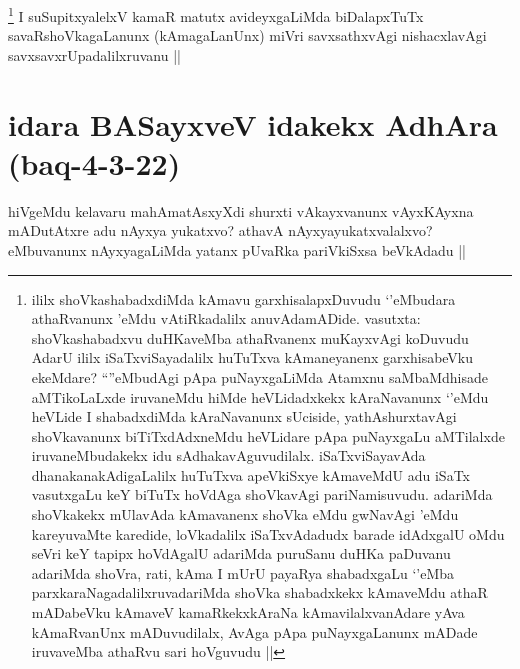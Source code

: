 
\begin{artha}
\footnote{ililx shoVkashabadxdiMda kAmavu garxhisalapxDuvudu `\stext'eMbudara athaRvanunx \stext'eMdu vAtiRkadalilx anuvAdamADide. vasutxta: shoVkashabadxvu duHKaveMba athaRvanenx muKayxvAgi koDuvudu AdarU ililx iSaTxviSayadalilx huTuTxva kAmaneyanenx garxhisabeVku ekeMdare? ``\stext''eMbudAgi pApa puNayxgaLiMda Atamxnu saMbaMdhisade aMTikoLaLxde iruvaneMdu hiMde heVLidadxkekx kAraNavanunx `\stext'eMdu heVLide I shabadxdiMda kAraNavanunx sUciside, yathAshurxtavAgi shoVkavanunx biTiTxdAdxneMdu heVLidare pApa puNayxgaLu aMTilalxde iruvaneMbudakekx idu sAdhakavAguvudilalx. iSaTxviSayavAda dhanakanakAdigaLalilx huTuTxva apeVkiSxye kAmaveMdU adu iSaTx vasutxgaLu keY biTuTx hoVdAga shoVkavAgi pariNamisuvudu. adariMda shoVkakekx mUlavAda kAmavanenx shoVka eMdu gwNavAgi \stext'eMdu kareyuvaMte karedide, loVkadalilx iSaTxvAdadudx barade idAdxgalU oMdu seVri keY tapipx hoVdAgalU adariMda puruSanu duHKa paDuvanu adariMda shoVra, rati, kAma I mUrU payaRya shabadxgaLu `\stext'eMba parxkaraNagadalilxruvadariMda shoVka shabadxkekx kAmaveMdu athaR mADabeVku kAmaveV kamaRkekxkAraNa kAmavilalxvanAdare yAva kAmaRvanUnx mADuvudilalx, AvAga pApa puNayxgaLanunx mADade iruvaveMba athaRvu sari hoVguvudu ||}
I suSupitxyalelxV kamaR matutx avideyxgaLiMda biDalapxTuTx savaRshoVkagaLanunx (kAmagaLanUnx) miVri savxsathxvAgi nishacxlavAgi savxsavxrUpadalilxruvanu ||
\end{artha}

\section*{idara BASayxveV idakekx AdhAra (baq-4-3-22)}


\begin{artha}
hiVgeMdu kelavaru mahAmatAsxyXdi shurxti vAkayxvanunx vAyxKAyxna mADutAtxre adu nAyxya yukatxvo? athavA nAyxyayukatxvalalxvo? eMbuvanunx nAyxyagaLiMda yatanx pUvaRka pariVkiSxsa beVkAdadu ||
\end{artha}



